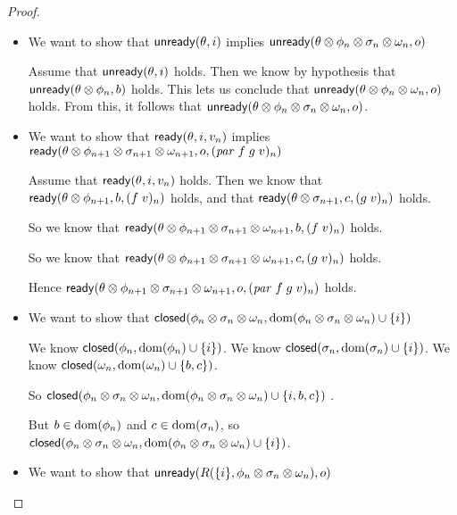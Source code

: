 \begin{proof}
\begin{itemize}
\item We want to show that $\mathsf{unready}({\theta}, {i})$ implies $\mathsf{unready}({\theta \otimes \phi_n \otimes \sigma_n \otimes \omega_n}, {o})$ 

  Assume that $\mathsf{unready}({\theta}, {i})$ holds. Then we know by hypothesis
  that $\mathsf{unready}({\theta \otimes \phi_n}, {b})$ holds. This lets us conclude
  that $\mathsf{unready}({\theta \otimes \phi_n \otimes \omega_n}, {o})$ holds. From this,
  it follows that $\mathsf{unready}({\theta \otimes  \phi_n \otimes \sigma_n \otimes \omega_n}, {o})$.

\item We want to show that $\mathsf{ready}({\theta}, {i}, {v_n})$ implies $\mathsf{ready}({\theta \otimes \phi_{n+1} \otimes \sigma_{n+1} \otimes \omega_{n+1}}, {o}, {(\mathit{par}\;f\;g\;v)_n})$ 

  Assume that $\mathsf{ready}({\theta}, {i}, {v_n})$ holds. Then we know that 
  $\mathsf{ready}({\theta \otimes \phi_{n+1}}, {b}, {(f\;v)_n})$ holds, and that 
  $\mathsf{ready}({\theta \otimes \sigma_{n+1}}, {c}, {(g\;v)_n})$ holds. 

  So we know that $\mathsf{ready}({\theta \otimes \phi_{n+1} \otimes \sigma_{n+1} \otimes \omega_{n+1}}, {b}, {(f\;v)_n})$ holds.

  So we know that $\mathsf{ready}({\theta \otimes \phi_{n+1} \otimes \sigma_{n+1} \otimes \omega_{n+1}}, {c}, {(g\;v)_n})$ holds.

  Hence $\mathsf{ready}({\theta \otimes \phi_{n+1} \otimes \sigma_{n+1} \otimes \omega_{n+1}}, {o}, {(\mathit{par}\;f\;g\;v)_n})$ holds.

\item We want to show that $\mathsf{closed}({\phi_n \otimes \sigma_n \otimes \omega_n}, {\mbox{dom}({\phi_n \otimes \sigma_n \otimes \omega_n}) \cup \{{i}\}})$ 

  We know $\mathsf{closed}({\phi_n}, {\mbox{dom}({\phi_n}) \cup \{{i}\}})$. 
  We know $\mathsf{closed}({\sigma_n}, {\mbox{dom}({\sigma_n}) \cup \{{i}\}})$. 
  We know $\mathsf{closed}({\omega_n}, {\mbox{dom}({\omega_n}) \cup \{{b,c}\}})$. 

  So $\mathsf{closed}({\phi_n \otimes \sigma_n \otimes \omega_n}, {\mbox{dom}({\phi_n \otimes \sigma_n \otimes \omega_n}) \cup \{{i, b, c}\}})$ .

  But $b \in \mbox{dom}({\phi_n})$ and $c \in \mbox{dom}({\sigma_n})$, so 
   $\mathsf{closed}({\phi_n \otimes \sigma_n \otimes \omega_n}, {\mbox{dom}({\phi_n \otimes \sigma_n \otimes \omega_n}) \cup \{{i}\}})$. 

\item We want to show that $\mathsf{unready}({R(\{{i}\}, \phi_n \otimes \sigma_n \otimes \omega_n)}, {o})$ 


\end{itemize}
\end{proof}
